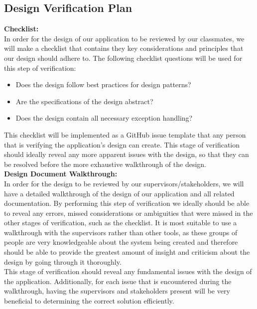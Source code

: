 \documentclass[12pt, titlepage]{article}
\begin{document}
\subsection{Design Verification Plan}

\textbf{Checklist:}\\
In order for the design of our application to be reviewed by our classmates, we will make a checklist that contains they key considerations and principles that our design should adhere to. The following checklist questions will be used for this step of verification:
\begin{itemize}
    \item Does the design follow best practices for design patterns?
    \item Are the specifications of the design abstract?
    \item Does the design contain all necessary exception handling?
\end{itemize}
This checklist will be implemented as a GitHub issue template that any person that is verifying the application’s design can create. This stage of verification should ideally reveal any more apparent issues with the design, so that they can be resolved before the more exhaustive walkthrough of the design.\\
\newline \textbf{Design Document Walkthrough:}\\
\newline In order for the design to be reviewed by our supervisors/stakeholders, we will have a detailed walkthrough of the design of our application and all related documentation. By performing this step of verification we ideally should be able to reveal any errors, missed considerations or ambiguities that were missed in the other stages of verification, such as the checklist. It is most suitable to use a walkthrough with the supervisors rather than other tools, as these groups of people are very knowledgeable about the system being created and therefore should be able to provide the greatest amount of insight and criticism about the design by going through it thoroughly.\\
\newline This stage of verification should reveal any fundamental issues with the design of the application. Additionally, for each issue that is encountered during the walkthrough, having the supervisors and stakeholders present will be very beneficial to determining the correct solution efficiently.
\end{document}
